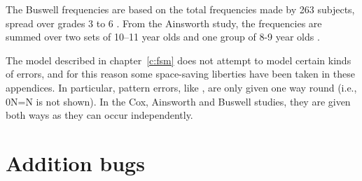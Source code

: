 \begin{table}[t]\small
{}
\end{table}






The Buswell frequencies are based on the total frequencies made by 263
subjects, spread over grades 3 to 6 \citeyear[tables XXXV to~XXXVII,
pp.~136--139]{buswdiag}.  From the Ainsworth study, the frequencies are
summed over two sets of 10--11 year olds and one group of 8-9 year olds
\cite[table~2, p.~32]{shar}.

The model described in chapter~\ref{c:fsm} does not attempt to model
certain kinds of errors, and for this reason some space-saving liberties
have been taken in these appendices. In particular, pattern errors, like
, are only given one way round (i.e., \x0N=N
is not shown). In the Cox, Ainsworth and Buswell studies, they are given
both ways as they can occur independently.

\section*{Addition bugs}

\begin{singlespace}

\end{singlespace}
